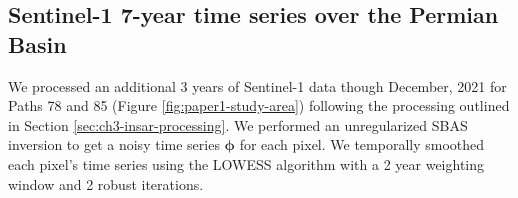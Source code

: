 %


\subsection{Sentinel-1 7-year time series over the Permian Basin}
We processed an additional 3 years of Sentinel-1 data though December, 2021 for Paths 78 and 85 (Figure \ref{fig:paper1-study-area}) following the processing outlined in Section \ref{sec:ch3-insar-processing}. 
We performed an unregularized SBAS inversion to get a noisy time series $ \bm{\phi} $ for each pixel. We temporally smoothed each pixel's time series using the LOWESS algorithm with a 2 year weighting window and 2 robust iterations.

